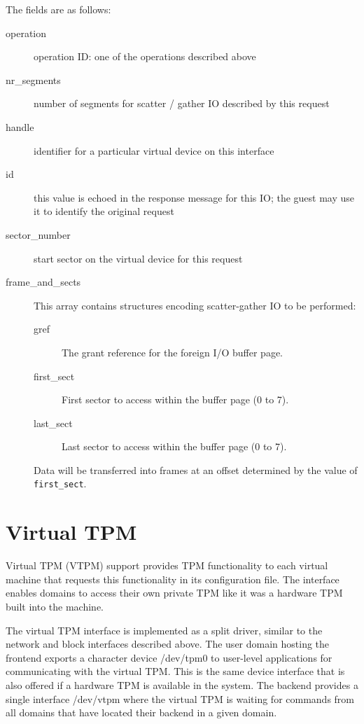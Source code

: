\documentclass[11pt,twoside,final,openright]{report}
\begin{document}
The fields are as follows:

\begin{description}
\item[operation] operation ID: one of the operations described above
\item[nr\_segments] number of segments for scatter / gather IO
  described by this request
\item[handle] identifier for a particular virtual device on this
  interface
\item[id] this value is echoed in the response message for this IO;
  the guest may use it to identify the original request
\item[sector\_number] start sector on the virtual device for this
  request
\item[frame\_and\_sects] This array contains structures encoding
  scatter-gather IO to be performed:
  \begin{description}
  \item[gref] The grant reference for the foreign I/O buffer page.
  \item[first\_sect] First sector to access within the buffer page (0 to 7).
  \item[last\_sect] Last sector to access within the buffer page (0 to 7).
  \end{description}
  Data will be transferred into frames at an offset determined by the
  value of {\tt first\_sect}.
\end{description}

\section{Virtual TPM}

Virtual TPM (VTPM) support provides TPM functionality to each virtual
machine that requests this functionality in its configuration file.
The interface enables domains to access their own private TPM like it
was a hardware TPM built into the machine.

The virtual TPM interface is implemented as a split driver,
similar to the network and block interfaces described above.
The user domain hosting the frontend exports a character device /dev/tpm0
to user-level applications for communicating with the virtual TPM.
This is the same device interface that is also offered if a hardware TPM
is available in the system. The backend provides a single interface
/dev/vtpm where the virtual TPM is waiting for commands from all domains
that have located their backend in a given domain.
\end{document}
